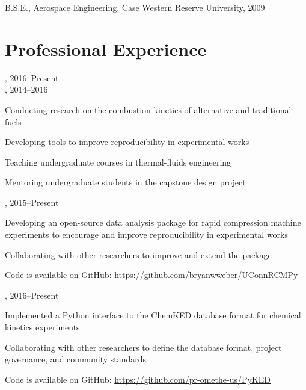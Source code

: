 B.S.E., Aerospace Engineering, Case Western Reserve University, 2009

\section{{\sectionfont Professional Experience}}

,  \hfill 2016--Present\\
,  \hfill 2014--2016

\begin{innerlist}
    \item Conducting research on the combustion kinetics of alternative and traditional fuels
    \item Developing tools to improve reproducibility in experimental works
    \item Teaching undergraduate courses in thermal-fluids engineering
    \item Mentoring undergraduate students in the capstone design project
\end{innerlist}

\vspace{\baselineskip}

,  \hfill 2015--Present

\begin{innerlist}
    \item Developing an open-source data analysis package for rapid compression machine experiments to encourage and improve reproducibility in experimental works
    \item Collaborating with other researchers to improve and extend the package
    \item Code is available on GitHub: \url{https://github.com/bryanwweber/UConnRCMPy}
\end{innerlist}

\vspace{\baselineskip}

,  \hfill 2016--Present

\begin{innerlist}
    \item Implemented a Python interface to the ChemKED database format for chemical kinetics experiments
    \item Collaborating with other researchers to define the database format, project governance, and community standards
    \item Code is available on GitHub: \url{https://github.com/pr-omethe-us/PyKED}
\end{innerlist}

